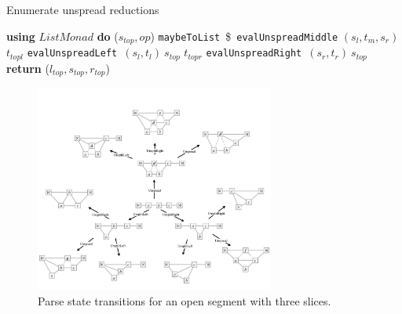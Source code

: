 \documentclass[12pt,a4paper,twoside,openany]{report} \usepackage[pdfborder={0 0 0}]{hyperref}    %
\theoremstyle{definition} \newtheorem{definition}{Definition}[section]
\begin{document}
  \begin{algorithm}[h] \caption{Enumerate unspread reductions} \label{code:heuristic0}
    \begin{algorithmic}[1]  \State \textbf{using} $List Monad$
      \textbf{do} \State ($s_{top}, op$) \gets \texttt{maybeToList}~\$~\texttt{evalUnspreadMiddle} $(s_l, t_m, s_r)$
      \State $t_{topl}$ \gets \texttt{evalUnspreadLeft}~$(s_l, t_l)~s_{top}$ \State $t_{topr}$ \gets
      \texttt{evalUnspreadRight}~$(s_r, t_r)~s_{top}$ \State \textbf{return} ($l_{top}, s_{top}, r_{top}$) \EndFunction
    \end{algorithmic} \end{algorithm}


    \begin{figure}[h] \centering \includegraphics[width=0.7\textwidth]{impl/parseTreeOpen.png} \caption{Parse state
    transitions for an open segment with three slices.} \label{fig:statetrans} \end{figure}
\end{document}
